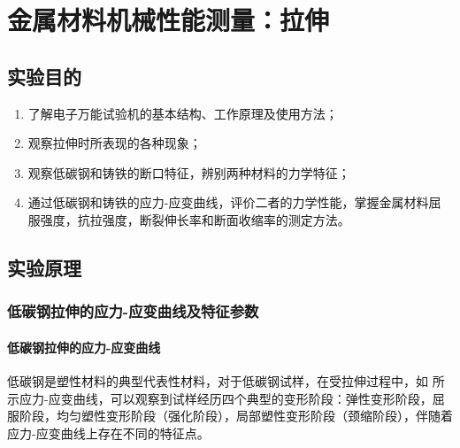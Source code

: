 \chapter{金属材料机械性能测量：拉伸}
\section{实验目的}
\begin{enumerate}
    \item 了解电子万能试验机的基本结构、工作原理及使用方法；
    \item 观察拉伸时所表现的各种现象；
    \item 观察低碳钢和铸铁的断口特征，辨别两种材料的力学特征；
    \item 通过低碳钢和铸铁的应力-应变曲线，评价二者的力学性能，掌握金属材料屈服强度，抗拉强度，断裂伸长率和断面收缩率的测定方法。
\end{enumerate}
\section{实验原理}%
\subsection{低碳钢拉伸的应力-应变曲线及特征参数}
\subsubsection{低碳钢拉伸的应力-应变曲线}
低碳钢是塑性材料的典型代表性材料，对于低碳钢试样，在受拉伸过程中，如 所示应力-应变曲线，可以观察到试样经历四个典型的变形阶段：弹性变形阶段，屈服阶段，均匀塑性变形阶段（强化阶段），局部塑性变形阶段（颈缩阶段），伴随着应力-应变曲线上存在不同的特征点。
\begin{figure}[!ht]
    \begin{floatrow}\centering
    \end{floatrow}
\end{figure}
